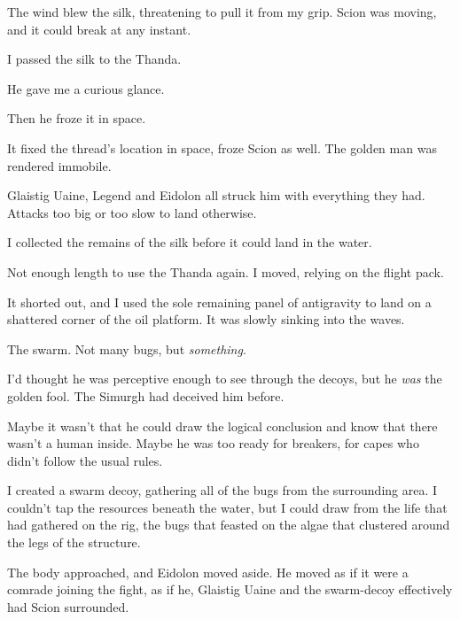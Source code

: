 The wind blew the silk, threatening to pull it from my grip.  Scion was moving, and it could break at any instant.



I passed the silk to the Thanda.



He gave me a curious glance.



Then he froze it in space.



It fixed the thread's location in space, froze Scion as well.  The golden man was rendered immobile.



Glaistig Uaine, Legend and Eidolon all struck him with everything they had.  Attacks too big or too slow to land otherwise.



I collected the remains of the silk before it could land in the water.



Not enough length to use the Thanda again.  I moved, relying on the flight pack.



It shorted out, and I used the sole remaining panel of antigravity to land on a shattered corner of the oil platform.  It was slowly sinking into the waves.



The swarm.  Not many bugs, but \emph{something}.



I'd thought he was perceptive enough to see through the decoys, but he \emph{was} the golden fool.  The Simurgh had deceived him before.



Maybe it wasn't that he could draw the logical conclusion and know that there wasn't a human inside.  Maybe he was too ready for breakers, for capes who didn't follow the usual rules.



I created a swarm decoy, gathering all of the bugs from the surrounding area.  I couldn't tap the resources beneath the water, but I could draw from the life that had gathered on the rig, the bugs that feasted on the algae that clustered around the legs of the structure.



The body approached, and Eidolon moved aside.  He moved as if it were a comrade joining the fight, as if he, Glaistig Uaine and the swarm-decoy effectively had Scion surrounded.



